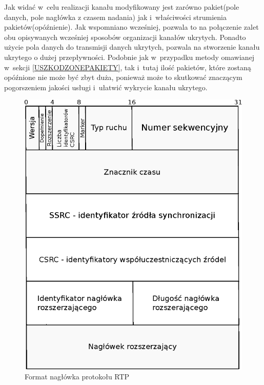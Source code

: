 \documentclass[a4paper, twoside, 12pt]{report}
\begin{document}
        Jak widać w~celu realizacji kanału modyfikowany jest zarówno pakiet(pole danych,
        pole nagłówka z czasem nadania) jak i~właściwości strumienia pakietów(opóźnienie).
        Jak wspomniano wcześniej, pozwala to na połączenie zalet obu opisywanych
        wcześniej sposobów organizacji kanałów ukrytych. Ponadto użycie pola danych
        do transmisji danych ukrytych, pozwala na stworzenie kanału ukrytego o
        dużej przepływności. Podobnie jak w~przypadku metody omawianej w~sekcji
        \ref{USZKODZONEPAKIETY}, tak i~tutaj ilość pakietów, które zostaną opóźnione
        nie może być zbyt duża, ponieważ może to skutkować znaczącym pogorszeniem
        jakości usługi i~ułatwić wykrycie kanału ukrytego.

        \begin{figure}[h]
                \centering
                \includegraphics[scale=0.8]{rtp_header}
                \caption{Format nagłówka protokołu RTP}
                \label{RTPHEADER}
        \end{figure}
\end{document}
